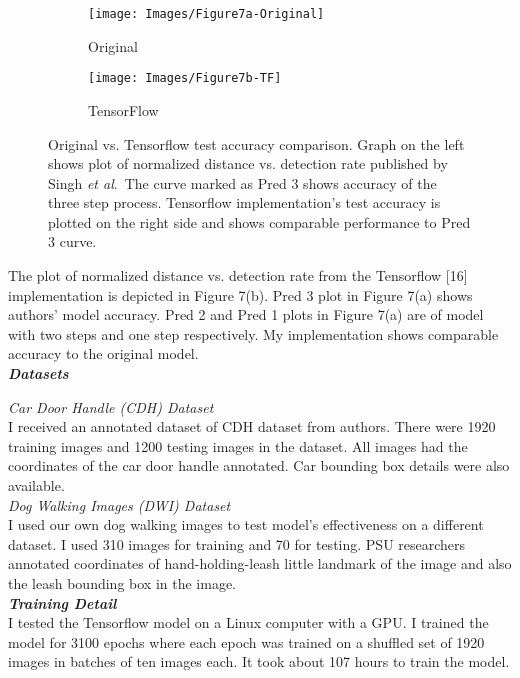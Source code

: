 \documentclass [11pt,letterpaper ,twoside ,openany ]{report}
\begin{document}
    \begin{figure}[h!]
    \centering
        \begin{subfigure}[b]{0.49\linewidth}
            \texttt{[image: Images/Figure7a-Original]}
            \caption{Original}
        \end{subfigure}
        \begin{subfigure}[b]{0.49\linewidth}
            \texttt{[image: Images/Figure7b-TF]}
            \caption{TensorFlow}
        \end{subfigure}
        \caption{Original vs. Tensorflow test accuracy comparison. Graph on the left shows plot of normalized distance vs. detection rate published by Singh \textit{et al}.\ The curve marked as Pred 3 shows accuracy of the three step process. Tensorflow implementation's test accuracy is plotted on the right side and shows comparable performance to Pred 3 curve.}
        \label{fig:compare}
    \end{figure}

    The plot of normalized distance vs. detection rate from the Tensorflow [16] implementation is depicted in Figure 7(b). Pred 3 plot in Figure 7(a) shows authors' model accuracy. Pred 2 and Pred 1 plots in Figure 7(a) are of model with two steps and one step respectively. My implementation shows comparable accuracy to the original model.\\

    \noindent
    \textbf{\textit{Datasets}}

    \noindent
    \textit{Car Door Handle (CDH) Dataset}\\
    I received an annotated dataset of CDH dataset from authors. There were 1920 training images and 1200 testing images in the dataset. All images had the coordinates of the car door handle annotated. Car bounding box details were also available.\\

    \noindent
    \textit{Dog Walking Images (DWI) Dataset}\\
    I used our own dog walking images to test model's effectiveness on a different dataset. I used 310 images for training and 70 for testing. PSU researchers annotated coordinates of hand-holding-leash little landmark of the image and also the leash bounding box in the image.\\

    \noindent
    \textbf{\textit{Training Detail}}\\
    I tested the Tensorflow model on a Linux computer with a GPU. I trained the model for 3100  epochs where each epoch was trained on a shuffled set of 1920 images in batches of ten images each. It took about 107 hours to train the model.
\end{document}
